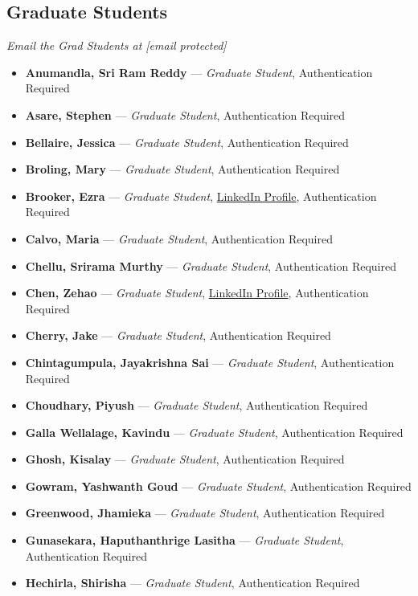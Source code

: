 \documentclass[12pt,a4paper]{article}
\begin{document}
\subsection{Graduate Students}
\textit{Email the Grad Students at [email protected]}
\begin{itemize}
    \item \textbf{Anumandla, Sri Ram Reddy} --- \textit{Graduate Student}, Authentication Required
    \item \textbf{Asare, Stephen} --- \textit{Graduate Student}, Authentication Required
    \item \textbf{Bellaire, Jessica} --- \textit{Graduate Student}, Authentication Required
    \item \textbf{Broling, Mary} --- \textit{Graduate Student}, Authentication Required
    \item \textbf{Brooker, Ezra} --- \textit{Graduate Student}, \href{https://www.linkedin.com/in/ezra-brooker-3957a2228/}{LinkedIn Profile}, Authentication Required
    \item \textbf{Calvo, Maria} --- \textit{Graduate Student}, Authentication Required
    \item \textbf{Chellu, Srirama Murthy} --- \textit{Graduate Student}, Authentication Required
    \item \textbf{Chen, Zehao} --- \textit{Graduate Student}, \href{https://www.linkedin.com/in/zehao-chen-5b5657140}{LinkedIn Profile}, Authentication Required
    \item \textbf{Cherry, Jake} --- \textit{Graduate Student}, Authentication Required
    \item \textbf{Chintagumpula, Jayakrishna Sai} --- \textit{Graduate Student}, Authentication Required
    \item \textbf{Choudhary, Piyush} --- \textit{Graduate Student}, Authentication Required
    \item \textbf{Galla Wellalage, Kavindu} --- \textit{Graduate Student}, Authentication Required
    \item \textbf{Ghosh, Kisalay} --- \textit{Graduate Student}, Authentication Required
    \item \textbf{Gowram, Yashwanth Goud} --- \textit{Graduate Student}, Authentication Required
    \item \textbf{Greenwood, Jhamieka} --- \textit{Graduate Student}, Authentication Required
    \item \textbf{Gunasekara, Haputhanthrige Lasitha} --- \textit{Graduate Student}, Authentication Required
    \item \textbf{Hechirla, Shirisha} --- \textit{Graduate Student}, Authentication Required

\end{itemize}
\end{document}

